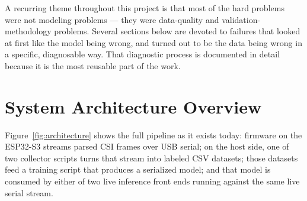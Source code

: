 \documentclass[11pt,a4paper]{article}
\begin{document}
A recurring theme throughout this project is that most of the hard
problems were not modeling problems --- they were data-quality and
validation-methodology problems. Several sections below are devoted to
failures that looked at first like the model being wrong, and turned out
to be the data being wrong in a specific, diagnosable way. That diagnostic
process is documented in detail because it is the most reusable part of
the work.

\section{System Architecture Overview}

Figure~\ref{fig:architecture} shows the full pipeline as it exists today:
firmware on the ESP32-S3 streams parsed CSI frames over USB serial; on
the host side, one of two collector scripts turns that stream into
labeled CSV datasets; those datasets feed a training script that produces
a serialized model; and that model is consumed by either of two live
inference front ends running against the same live serial stream.
\end{document}
